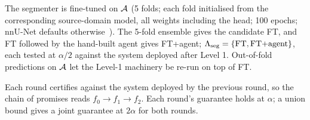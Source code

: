 The segmenter is fine-tuned on $\mathcal{A}$ (5 folds; each fold initialised from the corresponding source-domain model, all weights including the head; 100 epochs; nnU-Net defaults otherwise~\cite{isensee2021nnunet}).
The 5-fold ensemble gives the candidate FT, and FT followed by the hand-built agent gives FT+agent; $\Lambda_{\text{seg}}=\{\text{FT},\text{FT+agent}\}$, each tested at $\alpha/2$ against the system deployed after Level 1.
Out-of-fold predictions on $\mathcal{A}$ let the Level-1 machinery be re-run on top of FT.

Each round certifies against the system deployed by the previous round, so the chain of promises reads $f_0\to f_1\to f_2$.
Each round's guarantee holds at $\alpha$; a union bound gives a joint guarantee at $2\alpha$ for both rounds.
